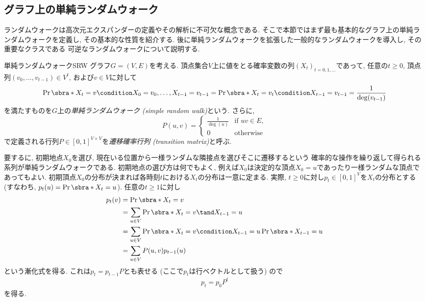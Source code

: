 \subsection{グラフ上の単純ランダムウォーク} \label{sec:SRW}
ランダムウォークは高次元エクスパンダーの定義やその解析に不可欠な概念である.
そこで本節ではまず最も基本的なグラフ上の単純ランダムウォークを定義し, その基本的な性質を紹介する.
後に単純ランダムウォークを拡張した一般的なランダムウォークを導入し, その重要なクラスである
可逆なランダムウォークについて説明する.
%
\begin{definition}{単純ランダムウォーク}{SRW}
  グラフ$G=(V,E)$を考える.
  頂点集合$V$上に値をとる確率変数の列$(X_t)_{t=0,1,\dots}$であって,
  任意の$t\ge 0$, 頂点列$(v_0,\dots,v_{t-1})\in V^t$, および$v\in V$に対して
  \[
    \Pr\sbra*{ X_t = v \condition X_0=v_0,\dots,X_{t-1} = v_{t-1} } = \Pr\sbra*{ X_t = v_t \condition X_{t-1} = v_{t-1}} = \frac{1}{\deg(v_{t-1})}
  \]
  を満たすものを$G$上の\emph{単純ランダムウォーク (simple random walk)}という.
  さらに,
  \[
    P(u,v) = \begin{cases}
      \frac{1}{\deg(u)}	& \text{if }uv\in E,\\
      0 & \text{otherwise}
    \end{cases}
  \]
  で定義される行列$P \in [0,1]^{V\times V}$を\emph{遷移確率行列 (transition matrix)}と呼ぶ.
\end{definition}
%
要するに, 初期地点$X_0$を選び, 現在いる位置から一様ランダムな隣接点を選びそこに遷移するという
確率的な操作を繰り返して得られる系列が単純ランダムウォークである.
初期地点の選び方は何でもよく,
例えば$X_0$は決定的な頂点$X_0=u$であったり一様ランダムな頂点であってもよい.
%
初期頂点$X_0$の分布が決まれば各時刻$t$における$X_t$の分布は一意に定まる.
実際, $t\ge 0$に対し$p_t \in [0,1]^{V}$を$X_t$の分布とする
  (すなわち, $p_t(u) = \Pr\sbra*{X_t = u}$).
任意の$t\ge 1$に対し
\begin{align*}
  p_t(v) &= \Pr\sbra*{X_t = v} \\
    &= \sum_{u\in V}\Pr\sbra*{ X_t = v \tand X_{t-1} = u} \\
    &= \sum_{u\in V}\Pr\sbra*{ X_t = v \condition X_{t-1} = u} \Pr\sbra*{X_{t-1} = u}  \\
    &= \sum_{u\in V} P(u,v) p_{t-1}(u)
\end{align*}
という漸化式を得る.
これは$p_{t} = p_{t-1} P$とも表せる (ここで$p_t$は行ベクトルとして扱う) ので
\begin{align}
  p_t = p_0 P^t \label{eq:p_t SRW}
\end{align}
を得る.

